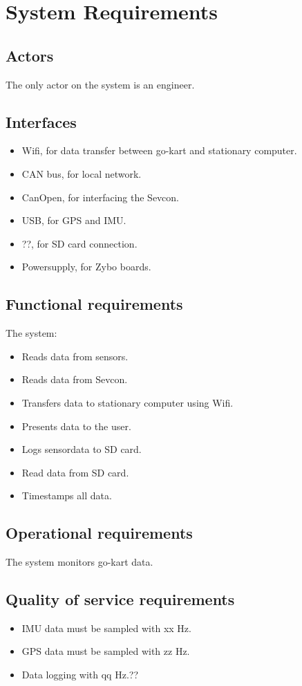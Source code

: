 \section{System Requirements} %
\label{sec:system_requirements}


\subsection{Actors}
The only actor on the system is an engineer.

\subsection{Interfaces}
\begin{itemize}
\item Wifi, for data transfer between go-kart and stationary computer.
\item CAN bus, for local network.
\item CanOpen, for interfacing the Sevcon.
\item USB, for GPS and IMU.
\item ??, for SD card connection.
\item Powersupply, for Zybo boards.
\end{itemize}

\subsection{Functional requirements}
The system: 
\begin{itemize}
\item Reads data from sensors.
\item Reads data from Sevcon.
\item Transfers data to stationary computer using Wifi.
\item Presents data to the user.
\item Logs sensordata to SD card.
\item Read data from SD card.
\item Timestamps all data. 
\end{itemize}

\subsection{Operational requirements}
The system monitors go-kart data.%

\subsection{Quality of service requirements}
\begin{itemize}
\item IMU data must be sampled with xx Hz.
\item GPS data must be sampled with zz Hz.
\item Data logging with qq Hz.??
\end{itemize}

